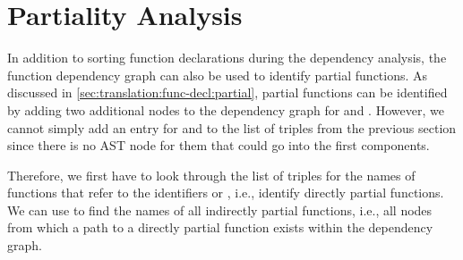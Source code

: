 \section{Partiality Analysis} \label{sec:implementation:partiality-analysis}
In addition to sorting function declarations during the dependency analysis, the function dependency graph can also be used to identify partial functions.
As discussed in \autoref{sec:translation:func-decl:partial}, partial functions can be identified by adding two additional nodes to the dependency graph for  and .
However, we cannot simply add an entry for  and  to the list of triples from the previous section since there is no AST node for them that could go into the first components.

Therefore, we first have to look through the list of triples for the names of functions that refer to the identifiers  or , i.e., identify directly partial functions.
We can use  to find the names of all indirectly partial functions, i.e., all nodes from which a path to a directly partial function exists within the dependency graph.

